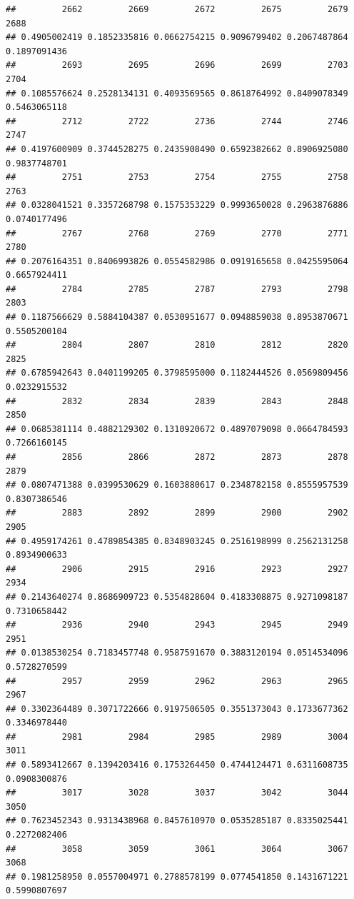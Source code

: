\documentclass[
]{article}
\begin{document}
\begin{verbatim}
##         2662         2669         2672         2675         2679         2688 
## 0.4905002419 0.1852335816 0.0662754215 0.9096799402 0.2067487864 0.1897091436 
##         2693         2695         2696         2699         2703         2704 
## 0.1085576624 0.2528134131 0.4093569565 0.8618764992 0.8409078349 0.5463065118 
##         2712         2722         2736         2744         2746         2747 
## 0.4197600909 0.3744528275 0.2435908490 0.6592382662 0.8906925080 0.9837748701 
##         2751         2753         2754         2755         2758         2763 
## 0.0328041521 0.3357268798 0.1575353229 0.9993650028 0.2963876886 0.0740177496 
##         2767         2768         2769         2770         2771         2780 
## 0.2076164351 0.8406993826 0.0554582986 0.0919165658 0.0425595064 0.6657924411 
##         2784         2785         2787         2793         2798         2803 
## 0.1187566629 0.5884104387 0.0530951677 0.0948859038 0.8953870671 0.5505200104 
##         2804         2807         2810         2812         2820         2825 
## 0.6785942643 0.0401199205 0.3798595000 0.1182444526 0.0569809456 0.0232915532 
##         2832         2834         2839         2843         2848         2850 
## 0.0685381114 0.4882129302 0.1310920672 0.4897079098 0.0664784593 0.7266160145 
##         2856         2866         2872         2873         2878         2879 
## 0.0807471388 0.0399530629 0.1603880617 0.2348782158 0.8555957539 0.8307386546 
##         2883         2892         2899         2900         2902         2905 
## 0.4959174261 0.4789854385 0.8348903245 0.2516198999 0.2562131258 0.8934900633 
##         2906         2915         2916         2923         2927         2934 
## 0.2143640274 0.8686909723 0.5354828604 0.4183308875 0.9271098187 0.7310658442 
##         2936         2940         2943         2945         2949         2951 
## 0.0138530254 0.7183457748 0.9587591670 0.3883120194 0.0514534096 0.5728270599 
##         2957         2959         2962         2963         2965         2967 
## 0.3302364489 0.3071722666 0.9197506505 0.3551373043 0.1733677362 0.3346978440 
##         2981         2984         2985         2989         3004         3011 
## 0.5893412667 0.1394203416 0.1753264450 0.4744124471 0.6311608735 0.0908300876 
##         3017         3028         3037         3042         3044         3050 
## 0.7623452343 0.9313438968 0.8457610970 0.0535285187 0.8335025441 0.2272082406 
##         3058         3059         3061         3064         3067         3068 
## 0.1981258950 0.0557004971 0.2788578199 0.0774541850 0.1431671221 0.5990807697 

\end{verbatim}
\end{document}
